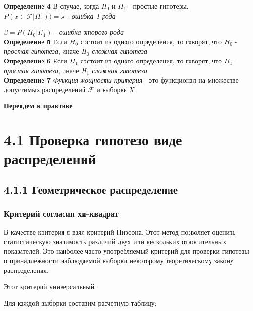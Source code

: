 \documentclass[a4paper,12pt, oneside]{book}
\begin{document}
\normalsize{\textbf{Определение 4}} В случае, когда $ H_0 $ и $ H_1 $ - простые гипотезы, $ P(x \in \mathcal{F} | H_0)) = \lambda $ - {\it ошибка 1 рода}

$ \beta = P(H_0 | H_1) $ - \textit{ошибка второго рода}\\

\normalsize{\textbf{Определение 5}} Если $ H_0 $ состоит из одного определения, то говорят, что $ H_0 $ - \textit{простая гипотеза}, иначе $ H_0 $  \textit{сложная гипотеза}\\

\normalsize{\textbf{Определение 6}} Если $ H_1 $ состоит из одного определения, то говорят, что $ H_1 $ - \textit{простая гипотеза}, иначе $ H_1 $  \textit{сложная гипотеза}\\

\normalsize{\textbf{Определение 7}} \textit{ Функция мощности критерия } - это функционал на множестве допустимых распределений  $ \mathcal{F} $  и выборке $ X $

\newpage
\begin{center}
	\textbf{\Large Перейдем к практике}
\end{center}

\chapter{4.1 Проверка гипотезо виде распределений}

\section{4.1.1 Геометрическое распределение}

\subsection{Критерий согласия хи-квадрат}

В качестве критерия я взял критерий Пирсона. Этот метод позволяет оценить статистическую значимость различий двух или нескольких относительных показателей. Это наиболее часто употребляемый критерий для проверки гипотезы о принадлежности наблюдаемой выборки некоторому теоретическому закону распределения.

Этот критерий универсальный

Для каждой выборки составим расчетную таблицу:
\end{document}
